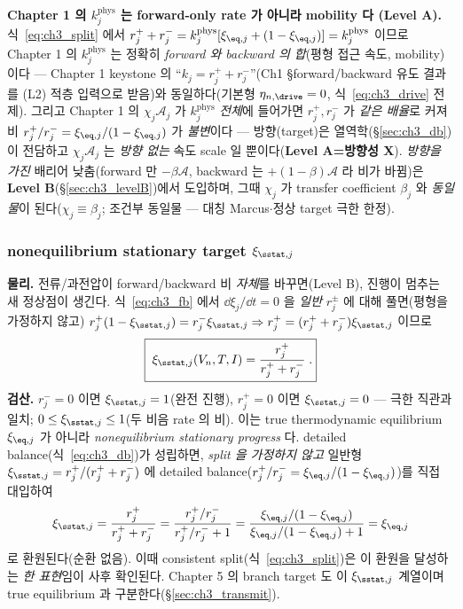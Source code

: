 \begin{keybox}
\textbf{Chapter 1 의 $k_j^{\mathrm{phys}}$ 는 forward-only rate 가 아니라 mobility 다 (Level A).} 식~\eqref{eq:ch3_split}
에서 $r_j^++r_j^-=k_j^{\mathrm{phys}}[\xi_{\eq,j}+(1-\xi_{\eq,j})]=k_j^{\mathrm{phys}}$ 이므로 Chapter 1 의
$k_j^{\mathrm{phys}}$ 는 정확히 \emph{forward 와 backward 의 합}(평형 접근 속도, mobility)이다 — Chapter 1
keystone 의 ``$k_j=r_j^++r_j^-$''(Ch1 §forward/backward 유도 결과를 (L2) 적층 입력으로 받음)와 동일하다(기본형
$\eta_{n,\drive}=0$, 식~\eqref{eq:ch3_drive} 전제). 그리고 Chapter 1 의 $\chi_j\mathcal A_j$
가 $k_j^{\mathrm{phys}}$ \emph{전체}에 들어가면 $r_j^+,r_j^-$ 가 \emph{같은 배율}로 커져 비
$r_j^+/r_j^-=\xi_{\eq,j}/(1-\xi_{\eq,j})$ 가 \emph{불변}이다 — 방향(target)은 열역학(\S\ref{sec:ch3_db})이
전담하고 $\chi_j\mathcal A_j$ 는 \emph{방향 없는} 속도 scale 일 뿐이다(\textbf{Level A=방향성 X}). \emph{방향을
가진} 배리어 낮춤(forward 만 $-\beta\mathcal A$, backward 는 $+(1-\beta)\mathcal A$ 라 비가 바뀜)은
\textbf{Level B}(\S\ref{sec:ch3_levelB})에서 도입하며, 그때 $\chi_j$ 가 transfer coefficient $\beta_j$ 와
\emph{동일물}이 된다($\chi_j\equiv\beta_j$; 조건부 동일물 — 대칭 Marcus$\cdot$정상 target 극한 한정).
\end{keybox}

\subsubsection{nonequilibrium stationary target $\xi_{\sstat,j}$}\label{sec:ch3_xiss}
\textbf{물리.} 전류/과전압이 forward/backward 비 \emph{자체}를 바꾸면(Level B), 진행이 멈추는 새 정상점이
생긴다. 식~\eqref{eq:ch3_fb} 에서 $\dd\xi_j/\dd t=0$ 을 \emph{일반} $r_j^\pm$ 에 대해 풀면(평형을 가정하지 않고)
$r_j^+(1-\xi_{\sstat,j})=r_j^-\xi_{\sstat,j}\Rightarrow r_j^+=(r_j^++r_j^-)\xi_{\sstat,j}$ 이므로
\begin{equation}
\boxed{\;\xi_{\sstat,j}(V_n,T,I)=\frac{r_j^+}{r_j^++r_j^-}\;.}
\label{eq:ch3_xiss}
\end{equation}
\textbf{검산.} $r_j^-=0$ 이면 $\xi_{\sstat,j}=1$(완전 진행), $r_j^+=0$ 이면 $\xi_{\sstat,j}=0$ — 극한 직관과 일치;
$0\le\xi_{\sstat,j}\le1$(두 비음 rate 의 비). 이는 true thermodynamic equilibrium $\xi_{\eq,j}$ 가 아니라
\emph{nonequilibrium stationary progress} 다. detailed balance(식~\eqref{eq:ch3_db})가 성립하면, \emph{split 을
가정하지 않고} 일반형 $\xi_{\sstat,j}=r_j^+/(r_j^++r_j^-)$ 에 detailed balance($r_j^+/r_j^-=\xi_{\eq,j}/(1-\xi_{\eq,j})$)를
직접 대입하여
\begin{equation*}
\xi_{\sstat,j}=\frac{r_j^+}{r_j^++r_j^-}=\frac{r_j^+/r_j^-}{r_j^+/r_j^-+1}
=\frac{\xi_{\eq,j}/(1-\xi_{\eq,j})}{\xi_{\eq,j}/(1-\xi_{\eq,j})+1}=\xi_{\eq,j}
\end{equation*}
로 환원된다(순환 없음). 이때 consistent split(식~\eqref{eq:ch3_split})은 이 환원을 달성하는 \emph{한 표현}임이
사후 확인된다. Chapter 5
의 branch target 도 이 $\xi_{\sstat,j}$ 계열이며 true equilibrium 과 구분한다(\S\ref{sec:ch3_transmit}).

